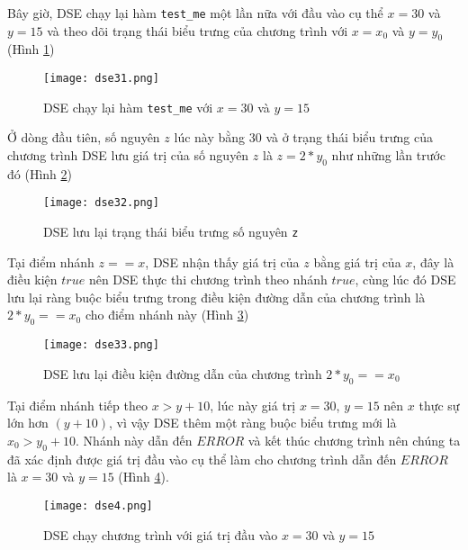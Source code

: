 Bây giờ, DSE chạy lại hàm \texttt{test\_me} một lần nữa với đầu vào cụ thể $x = 30$ và $y = 15$ và theo dõi trạng thái biểu trưng của chương trình với $x = x_{0}$ và $y = y_{0}$ (Hình \ref{fig:dse31})

\begin{figure}[H]	
	\begin{center}
		\texttt{[image: dse31.png]}
	\end{center}
	\caption{DSE chạy lại hàm \texttt{test\_me} với $ x = 30 $ và $ y = 15 $}
	\label{fig:dse31}
\end{figure}


Ở dòng đầu tiên, số nguyên $ z $ lúc này bằng $ 30 $ và ở trạng thái biểu trưng của chương trình DSE lưu giá trị của số nguyên $ z $ là $ z = 2*y_{0} $ như những lần trước đó (Hình \ref{fig:dse32})

\begin{figure}[H]	
	\begin{center}
		\texttt{[image: dse32.png]}
	\end{center}
	\caption{DSE lưu lại trạng thái biểu trưng số nguyên \texttt{z}}
	\label{fig:dse32}
\end{figure}

Tại điểm nhánh $ z == x $, DSE nhận thấy giá trị của $ z $ bằng giá trị của $ x $, đây là điều kiện $ true $ nên DSE thực thi chương trình theo nhánh $ true $, cùng lúc đó DSE lưu lại ràng buộc biểu trưng trong điều kiện đường dẫn của chương trình là $ 2*y_{0} == x_{0} $ cho điểm nhánh này (Hình \ref{fig:dse33})

\begin{figure}[H]	
	\begin{center}
		\texttt{[image: dse33.png]}
	\end{center}
	\caption{DSE lưu lại điều kiện đường dẫn của chương trình $ 2*y_{0} == x_{0} $}
	\label{fig:dse33}
\end{figure}

Tại điểm nhánh tiếp theo $ x > y+10 $, lúc này giá trị $x = 30 $, $ y = 15 $ nên $ x $ thực sự lớn hơn $(y+10)$, vì vậy DSE thêm một ràng buộc biểu trưng mới là $ x_{0} > y_{0}+ 10 $. Nhánh này dẫn đến $ ERROR $ và kết thúc chương trình nên chúng ta đã xác định được giá trị đầu vào cụ thể làm cho chương trình dẫn đến $ ERROR $ là $x = 30$ và $y = 15$ (Hình \ref{fig:dse4}).

\begin{figure}[H]
	\begin{center}
		\texttt{[image: dse4.png]}
	\end{center}	
	\caption{DSE chạy chương trình với giá trị đầu vào $x = 30$ và $y = 15$}
\label{fig:dse4}
\end{figure}

